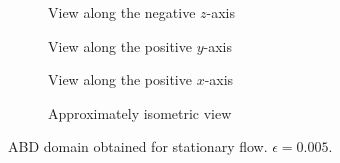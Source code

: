 \begin{figure}[htpb]
    \centering
    \begin{subfigure}[b]{0.475\textwidth}
        \centering
        
        \caption[]{{\small View along the negative $z$-axis}}
        \label{fig:u0_dom_err_bs32}
    \end{subfigure}
    \begin{subfigure}[b]{0.475\textwidth}
        \centering
        
        \caption[]{{\small View along the positive $y$-axis}}
        \label{fig:u0_dom_err_bs54}
    \end{subfigure}

    \begin{subfigure}[b]{0.475\textwidth}
        \centering
        
        \caption[]{{\small View along the positive $x$-axis}}
        \label{fig:u0_dom_err_dp54}
    \end{subfigure}
    \begin{subfigure}[b]{0.475\textwidth}
        \centering
        
        \caption[]{{\small Approximately isometric view}}
        \label{fig:u0_dom_err_dp87}
    \end{subfigure}
    \caption[Aviici is love, Aviici is life]{ABD domain obtained for stationary flow. $\epsilon=0.005$.}
    \label{fig:u0_dom_errs}
\end{figure}

